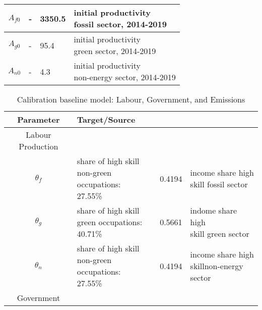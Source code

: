 \begin{table}[hh!!!!!]
\begin{center}
\begin{tabular}{c|lll}
				\hline
				$A_{f0}$&- &3350.5& \makecell[l]{initial productivity \\ fossil sector, 2014-2019}  \\
				\hline
				$A_{g0}$&- &95.4& \makecell[l]{initial productivity \\ green sector, 2014-2019}  \\
				\hline
				$A_{n0}$&- &4.3& \makecell[l]{initial productivity \\ non-energy sector, 2014-2019}  \\
				\hline \hline
			\end{tabular}
		\end{center}
	\end{table}



\begin{table}[hh!!!!!]
	\begin{center}
		\captionsetup{width=0.9\textwidth}
		\caption{ Calibration baseline model: Labour, Government, and Emissions}
		\label{tab:calib2}
		\begin{tabular}{c|lll}
			\hline \hline
			Parameter& Target/Source& \makecell[l]{Calibration}& \makecell[l]{Meaning}\\ 
			\hline
			\hline
			Labour Production&\multicolumn{3}{c}{}\\
			\hline 
			
			\hline
			$\theta_f$&\makecell[l]{share of high skill\\ non-green occupations: \\27.55\% }&0.4194&\makecell[l]{income share high \\ skill fossil sector}\\
			\hline
			$\theta_g$&\makecell[l]{share of high skill\\ green occupations: \\40.71\% }&0.5661&\makecell[l]{indome share high \\skill green sector}\\
			\hline
			$\theta_n$&\makecell[l]{share of high skill\\ non-green occupations: \\27.55\% }&0.4194&\makecell[l]{income share high \\ skillnon-energy sector}\\
			\hline
			\hline
			Government&\multicolumn{3}{c}{}\\
			\hline
			

\end{tabular}
\end{center}
\end{table}
